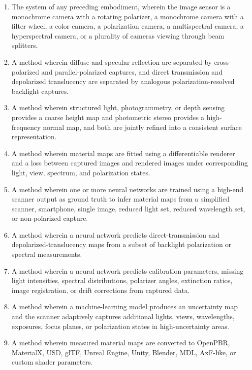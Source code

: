 \documentclass[11pt, twoside, listof=totocnumbered, bibliography=totocnumbered]{scrartcl}
\begin{document}
\begin{enumerate}
		\item The system of any preceding embodiment, wherein the image sensor is a monochrome camera with a rotating polarizer, a monochrome camera with a filter wheel, a color camera, a polarization camera, a multispectral camera, a hyperspectral camera, or a plurality of cameras viewing through beam splitters.
		
		\item A method wherein diffuse and specular reflection are separated by cross-polarized and parallel-polarized captures, and direct transmission and depolarized translucency are separated by analogous polarization-resolved backlight captures.
		
		\item A method wherein structured light, photogrammetry, or depth sensing provides a coarse height map and photometric stereo provides a high-frequency normal map, and both are jointly refined into a consistent surface representation.
		
		\item A method wherein material maps are fitted using a differentiable renderer and a loss between captured images and rendered images under corresponding light, view, spectrum, and polarization states.
		
		\item A method wherein one or more neural networks are trained using a high-end scanner output as ground truth to infer material maps from a simplified scanner, smartphone, single image, reduced light set, reduced wavelength set, or non-polarized capture.
		
		\item A method wherein a neural network predicts direct-transmission and depolarized-translucency maps from a subset of backlight polarization or spectral measurements.
		
		\item A method wherein a neural network predicts calibration parameters, missing light intensities, spectral distributions, polarizer angles, extinction ratios, image registration, or drift corrections from captured data.
		
		\item A method wherein a machine-learning model produces an uncertainty map and the scanner adaptively captures additional lights, views, wavelengths, exposures, focus planes, or polarization states in high-uncertainty areas.
		
		\item A method wherein measured material maps are converted to OpenPBR, MaterialX, USD, glTF, Unreal Engine, Unity, Blender, MDL, AxF-like, or custom shader parameters.
		

\end{enumerate}
\end{document}
